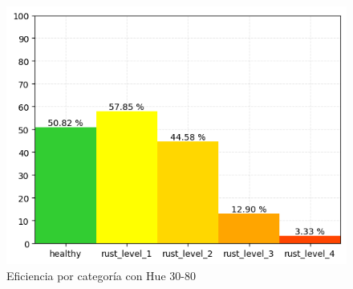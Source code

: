 \begin{figure}
\centering
\includegraphics[scale=0.6]{images/result_classes_30_80.png}
\caption{Eficiencia por categoría con Hue 30-80}
\label{img:efficiency_categories_30_80}
\end{figure}
